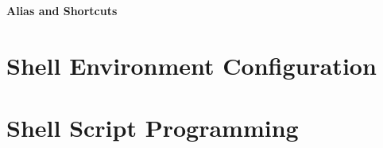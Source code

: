 \vspace{0.1in}
\noindent \textbf{Alias and Shortcuts}
\vspace{0.1in}

\section{Shell Environment Configuration}


\section{Shell Script Programming}













